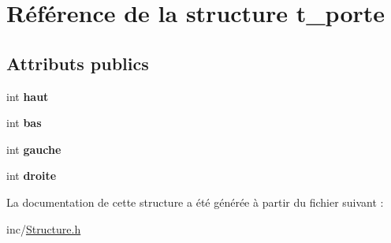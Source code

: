 \hypertarget{structt__porte}{}\section{Référence de la structure t\+\_\+porte}
\label{structt__porte}
\subsection*{Attributs publics}
\begin{DoxyCompactItemize}
\item 
\hypertarget{structt__porte_ab9badae84240760f12ac87a8460d7c88}{}int {\bfseries haut}\label{structt__porte_ab9badae84240760f12ac87a8460d7c88}

\item 
\hypertarget{structt__porte_ab3230cc718dc7114cb69397b7fccd354}{}int {\bfseries bas}\label{structt__porte_ab3230cc718dc7114cb69397b7fccd354}

\item 
\hypertarget{structt__porte_aa22eea74b3df2b17242b47aac674edda}{}int {\bfseries gauche}\label{structt__porte_aa22eea74b3df2b17242b47aac674edda}

\item 
\hypertarget{structt__porte_aeba1bee02d461c9dec06d97370a4ac44}{}int {\bfseries droite}\label{structt__porte_aeba1bee02d461c9dec06d97370a4ac44}

\end{DoxyCompactItemize}


La documentation de cette structure a été générée à partir du fichier suivant \+:\begin{DoxyCompactItemize}
\item 
inc/\hyperlink{Structure_8h}{Structure.\+h}\end{DoxyCompactItemize}

